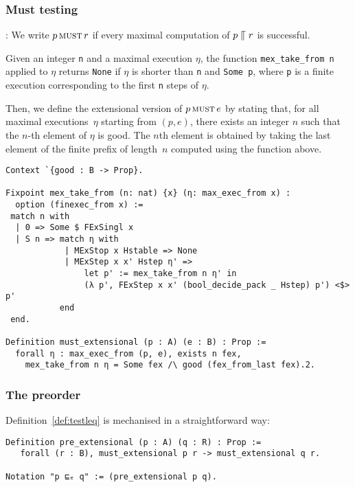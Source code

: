 \subsubsection{Must testing}

: We write $p \operatorname{\textsc{must}} r $ if every maximal
  computation of $p \mathrel{\llceil} r$ is successful.

Given an integer \lstinline|n| and a maximal execution $\eta$, the function
\lstinline|mex_take_from n| applied to $\eta$ returns \lstinline|None| if $\eta$
is shorter than \lstinline|n| and \lstinline|Some p|, where \lstinline|p| is a
finite execution corresponding to the first \lstinline|n| steps of $\eta$.

Then, we define the extensional version of $p \operatorname{\textsc{must}} e$ by stating that, for
all maximal executions~$\eta$ starting from $(p, e)$, there exists an integer
$n$ such that the $n$-th element of $\eta$ is good.
%
The $n$th element is obtained by taking the last element of the finite prefix of
length~$n$ computed using the function above.

\begin{mdframed}
\begin{verbatim}
Context `{good : B -> Prop}.

Fixpoint mex_take_from (n: nat) {x} (η: max_exec_from x) :
  option (finexec_from x) :=
 match n with
  | 0 => Some $ FExSingl x
  | S n => match η with
            | MExStop x Hstable => None
            | MExStep x x' Hstep η' =>
                let p' := mex_take_from n η' in
                (λ p', FExStep x x' (bool_decide_pack _ Hstep) p') <$> p'
           end
 end.

Definition must_extensional (p : A) (e : B) : Prop :=
  forall η : max_exec_from (p, e), exists n fex,
    mex_take_from n η = Some fex /\ good (fex_from_last fex).2.
\end{verbatim}
\end{mdframed}

\subsubsection{The preorder}

Definition~\ref{def:testleq} is mechanised in a straightforward way:

\begin{mdframed}
\begin{verbatim}
Definition pre_extensional (p : A) (q : R) : Prop :=
   forall (r : B), must_extensional p r -> must_extensional q r.

Notation "p ⊑ₑ q" := (pre_extensional p q).
\end{verbatim}
\end{mdframed}


